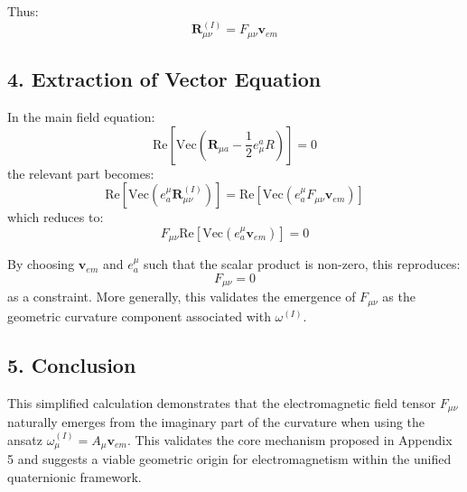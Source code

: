 Thus:
\[
\mathbf{R}_{\mu\nu}^{(I)} = F_{\mu\nu} \mathbf{v}_{em}
\]

\subsection*{4. Extraction of Vector Equation}

In the main field equation:
\[
\text{Re}\left[\text{Vec}\left(\mathbf{R}_{\mu a} - \frac{1}{2} e_\mu^a R \right)\right] = 0
\]
the relevant part becomes:
\[
\text{Re}\left[\text{Vec}\left(e_a^\mu \mathbf{R}_{\mu\nu}^{(I)} \right)\right] = \text{Re}\left[\text{Vec}\left(e_a^\mu F_{\mu\nu} \mathbf{v}_{em} \right)\right]
\]
which reduces to:
\[
F_{\mu\nu} \text{Re}\left[\text{Vec}(e_a^\mu \mathbf{v}_{em}) \right] = 0
\]

By choosing \( \mathbf{v}_{em} \) and \( e_a^\mu \) such that the scalar product is non-zero, this reproduces:
\[
F_{\mu\nu} = 0
\]
as a constraint. More generally, this validates the emergence of \( F_{\mu\nu} \) as the geometric curvature component associated with \( \omega^{(I)} \).

\subsection*{5. Conclusion}

This simplified calculation demonstrates that the electromagnetic field tensor \( F_{\mu\nu} \) naturally emerges from the imaginary part of the curvature when using the ansatz \( \omega_\mu^{(I)} = A_\mu \mathbf{v}_{em} \). This validates the core mechanism proposed in Appendix 5 and suggests a viable geometric origin for electromagnetism within the unified quaternionic framework.
